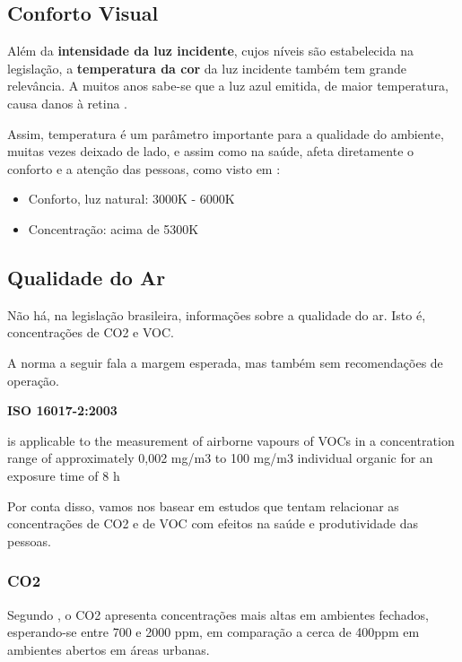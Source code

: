 \documentclass[../monografia.tex]{subfiles}
\begin{document}
\subsection{Conforto Visual} %
Além da \textbf{intensidade da luz incidente}, cujos níveis são estabelecida na legislação, a \textbf{temperatura da cor} da luz incidente também tem grande relevância. A muitos anos sabe-se que a luz azul emitida, de maior temperatura, causa danos à retina \cite{BlueLight}. \par
Assim, temperatura é um parâmetro importante para a qualidade do ambiente, muitas vezes deixado de lado, e assim como na saúde, afeta diretamente o conforto e a atenção das pessoas, como visto em \cite{VisualComfort}: 
\begin{itemize}
\item Conforto, luz natural: 3000K - 6000K
\item Concentração: acima de 5300K 
\end{itemize}

\subsection{Qualidade do Ar} %

Não há, na legislação brasileira, informações sobre a qualidade do ar. Isto é, concentrações de CO2 e VOC. 

A norma a seguir fala a margem esperada, mas também sem recomendações de operação. 

\begin{citacaoLonga} %
\textbf{ISO 16017-2:2003}

is applicable to the measurement of airborne vapours of VOCs in a concentration range of approximately 0,002 mg/m3 to 100 mg/m3 individual organic for an exposure time of 8 h
\end{citacaoLonga}

Por conta disso, vamos nos basear em estudos que tentam relacionar as concentrações de CO2 e de VOC com efeitos na saúde e produtividade das pessoas. 

\subsubsection{CO2}
Segundo \cite{AirQuality}, o CO2 apresenta concentrações mais altas em ambientes fechados, esperando-se entre 700 e 2000 ppm, em comparação a cerca de 400ppm em ambientes abertos em áreas urbanas\cite{co2Earth}. 
\end{document}
